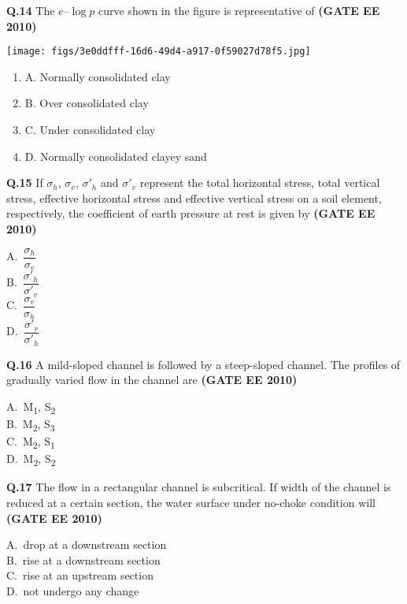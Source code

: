 \documentclass[journal,12pt,onecolumn]{exam}
\theoremstyle{remark}
\begin{document}
\noindent\textbf{Q.14} The $e$--$\log p$ curve shown in the figure is representative of 
\hfill\textbf{(GATE EE 2010)}

\texttt{[image: figs/3e0ddfff-16d6-49d4-a917-0f59027d78f5.jpg]}

    
\begin{enumerate}[label=]
\item A. Normally consolidated clay \\
\item B. Over consolidated clay \\
\item C. Under consolidated clay \\
\item D. Normally consolidated clayey sand
\end{enumerate}

\setlength{\parindent}{0pt}
\setlength{\parskip}{0.5cm}

\raggedright


\noindent\textbf{Q.15} If $\sigma_h$, $\sigma_v$, $\sigma'_h$ and $\sigma'_v$ represent the total horizontal stress, total vertical stress, effective horizontal stress and effective vertical stress on a soil element, respectively, the coefficient of earth pressure at rest is given by
\hfill\textbf{(GATE EE 2010)}
\begin{multicols}{4}
A.\ $\dfrac{\sigma_h}{\sigma_v}$ \\
B.\ $\dfrac{\sigma'_h}{\sigma'_v}$ \\
C.\ $\dfrac{\sigma_v}{\sigma_h}$ \\
D.\ $\dfrac{\sigma'_v}{\sigma'_h}$
\end{multicols}

\noindent\textbf{Q.16} A mild-sloped channel is followed by a steep-sloped channel. The profiles of gradually varied flow in the channel are
\hfill\textbf{(GATE EE 2010)}
\begin{multicols}{4}
A.\ M\textsubscript{1}, S\textsubscript{2} \\
B.\ M\textsubscript{2}, S\textsubscript{3} \\
C.\ M\textsubscript{2}, S\textsubscript{1} \\
D.\ M\textsubscript{2}, S\textsubscript{2}
\end{multicols}

\noindent\textbf{Q.17} The flow in a rectangular channel is subcritical. If width of the channel is reduced at a certain section, the water surface under no-choke condition will
\hfill\textbf{(GATE EE 2010)}
\begin{multicols}{4}
A.\ drop at a downstream section \\
B.\ rise at a downstream section \\
C.\ rise at an upstream section \\
D.\ not undergo any change
\end{multicols}
\end{document}
